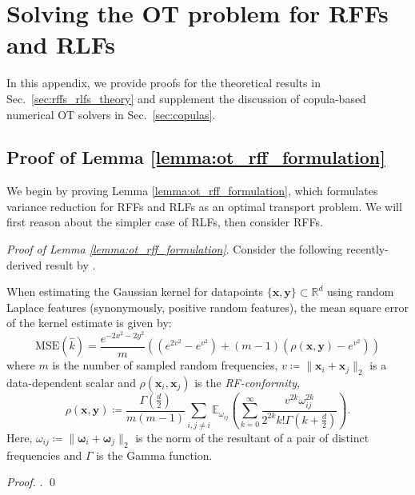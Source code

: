 \section{Solving the OT problem for RFFs and RLFs} \label{app:rff_rlf_theory}
In this appendix, we provide proofs for the theoretical results in Sec.~\ref{sec:rffs_rlfs_theory} and supplement the discussion of copula-based numerical OT solvers in Sec.~\ref{sec:copulas}.

\subsection{Proof of Lemma \ref{lemma:ot_rff_formulation}}
We begin by proving Lemma \ref{lemma:ot_rff_formulation}, which formulates variance reduction for RFFs and RLFs as an optimal transport problem. 
We will first reason about the simpler case of RLFs, then consider RFFs.

\emph{Proof of Lemma \ref{lemma:ot_rff_formulation}}. Consider the following recently-derived result by \citet{simrfs}.

\begin{lemma} \label{lemma:appendix_conformity}
    When estimating the Gaussian kernel  for datapoints $\{\boldsymbol{x},\boldsymbol{y}\} \subset \mathbb{R}^d$ using random Laplace features (synonymously, positive random features), the mean square error of the kernel estimate  is given by:
\begin{equation} \label{eq:prf_rmse_expression}
    \textrm{MSE}(\widehat{k}) = \frac{e^{-2x^2-2y^2}}{m}\left ((e^{2v^2}- e^{v^2}) + (m-1)(\rho(\boldsymbol{x},\boldsymbol{y}) - e^{v^2}) \right)
\end{equation}
where $m$ is the number of sampled random frequencies, $v \coloneqq \|\boldsymbol{x}_i + \boldsymbol{x}_j\|_2$ is a data-dependent scalar and $\rho(\boldsymbol{x}_i,\boldsymbol{x}_j)$ is the \emph{RF-conformity}, 
\begin{equation} \label{eq:def_rf_conformity}
 \rho(\boldsymbol{x}, \boldsymbol{y}) \coloneqq
\frac{\Gamma(\frac{d}{2})}{m(m-1)} \sum_{i,j \neq i} \mathbb{E}_{\omega_{ij}}\left( \sum_{k=0}^\infty \frac{v^{2k} \omega_{ij} ^{2k}}{2^{2k} k! \Gamma(k+\frac{d}{2})} \right).
\end{equation}
Here, $\omega_{ij} \coloneqq \| \boldsymbol{\omega}_i + \boldsymbol{\omega}_j \|_2$ is the norm of the resultant of a pair of distinct frequencies and $\Gamma$ is the Gamma function. 
\end{lemma}
\emph{Proof.} \citet{simrfs}. \qed

